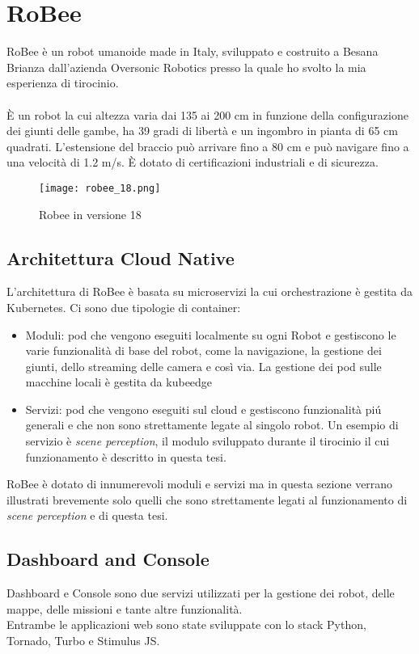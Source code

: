 \chapter{RoBee}\label{chap:robee}
RoBee è un robot umanoide made in Italy, sviluppato e costruito a Besana Brianza dall'azienda Oversonic Robotics presso la quale ho svolto la mia esperienza di tirocinio.\\\\
È un robot la cui altezza varia dai 135 ai 200 cm in funzione della configurazione dei giunti delle gambe, ha 39 gradi di libertà e un ingombro in pianta di 65 cm quadrati. L'estensione del braccio può arrivare fino a 80 cm e può navigare fino a una velocità di 1.2 m/s. È dotato di certificazioni industriali e di sicurezza.
\begin{figure}[H]
  \centering
  \texttt{[image: robee\_18.png]}
  \caption{Robee in versione 18}
\end{figure}
\section{Architettura Cloud Native}
L'architettura di RoBee è basata su microservizi la cui orchestrazione è gestita da Kubernetes. Ci sono due tipologie di container:
\begin{itemize}
  \item Moduli: pod che vengono eseguiti localmente su ogni Robot e gestiscono le varie funzionalità di base del robot, come la navigazione, la gestione dei giunti, dello streaming delle camera e così via. La gestione dei pod sulle macchine locali è gestita da \gls{kubeedge}
  \item Servizi: pod che vengono eseguiti sul cloud e gestiscono funzionalità piú generali e che non sono strettamente legate al singolo robot. Un esempio di servizio è \textit{scene perception}, il modulo sviluppato durante il tirocinio il cui funzionamento è descritto in questa tesi.
\end{itemize}
RoBee è dotato di innumerevoli moduli e servizi ma in questa sezione verrano illustrati brevemente solo quelli che sono strettamente legati al funzionamento di \textit{scene perception} e di questa tesi.
\section{Dashboard and Console}
Dashboard e Console sono due servizi utilizzati per la gestione dei robot, delle mappe, delle missioni e tante altre funzionalità.\\
Entrambe le applicazioni web sono state sviluppate con lo stack Python, Tornado, Turbo e Stimulus JS.
